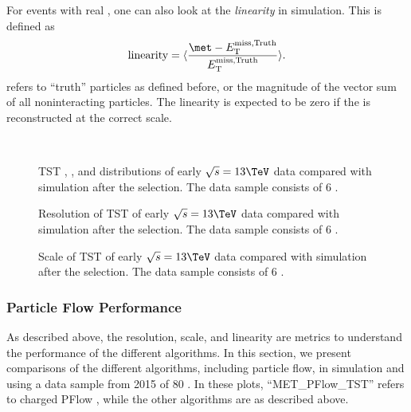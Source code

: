 For events with real \met, one can also look at the \textit{linearity} in simulation.
This is defined as
\begin{equation}
\text{linearity} = \langle \frac{\met - \mettrue}{\mettrue}  \rangle.
\end{equation}
\mettrue refers to ``truth'' particles as defined before, or the magnitude of the vector sum of all noninteracting particles.
The linearity is expected to be zero if the \met is reconstructed at the correct scale.

\begin{figure}
\caption{TST , , and \met distributions of early $\sqrt{s} = 13 \TeV$ data compared with simulation after the \Zmm selection. The data sample consists of 6 \ipb.} \label{fig:tst_met_zmumu}
 \\
\end{figure}

\begin{figure}
\caption{Resolution of TST \met of early $\sqrt{s} = 13 \TeV$ data compared with simulation after the \Zmm selection. The data sample consists of 6 \ipb.} \label{fig:tst_met_resolution_zmumu}
\end{figure}

\begin{figure}
\caption{Scale of TST \met of early $\sqrt{s} = 13 \TeV$ data compared with simulation after the \Zmm selection. The data sample consists of 6 \ipb.} \label{fig:tst_met_scale_zmumu}
\end{figure}


\subsubsection{Particle Flow Performance}

As described above, the resolution, scale, and linearity are metrics to understand the performance of the different \met algorithms.
In this section, we present comparisons of the different algorithms, including particle flow, in simulation and using a data sample from 2015 of 80 \ipb.
In these plots, ``MET\_PFlow\_TST'' refers to charged PFlow \met, while the other algorithms are as described above.

